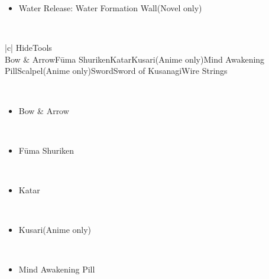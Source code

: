 \documentclass[a4paper,12pt]{article}
\begin{document}
\begin{itemize}
\item Water Release: Water Formation Wall(Novel only)
\end{itemize}\\ \par \vspace{0.5cm}

\begin{tabular}{|c|} \hline
HideTools \\
 \hline
Bow & ArrowFūma ShurikenKatarKusari(Anime only)Mind Awakening PillScalpel(Anime only)SwordSword of KusanagiWire Strings \\
\end{tabular}\\ \par \vspace{0.5cm}

\begin{itemize}
\item Bow & Arrow
\end{itemize}\\ \par \vspace{0.5cm}

\begin{itemize}
\item Fūma Shuriken
\end{itemize}\\ \par \vspace{0.5cm}

\begin{itemize}
\item Katar
\end{itemize}\\ \par \vspace{0.5cm}

\begin{itemize}
\item Kusari(Anime only)
\end{itemize}\\ \par \vspace{0.5cm}

\begin{itemize}
\item Mind Awakening Pill
\end{itemize}\\ \par \vspace{0.5cm}
\end{document}
